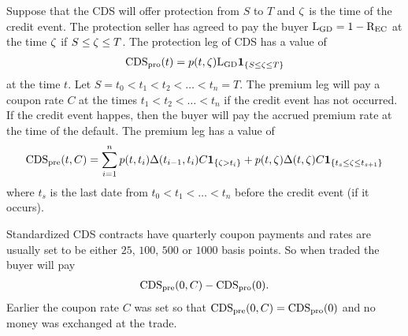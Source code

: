 Suppose that the CDS will offer protection from $S$ to $T$ and $\zeta$ is the time of the credit event. The protection seller has agreed to pay the buyer $\mathrm{L_{GD}} = 1 - \mathrm{R_{EC}}$ at the time $\zeta$ if $S \leq \zeta \leq T$. The protection leg of CDS has a value of
	\begin{align}
		\operatorname{\mathrm{CDS_{pro}}}(t) = p(t, \zeta) \mathrm{L_{GD}} \boldsymbol{1}_{ \{ S \leq \zeta \leq T \} }
	\end{align}
at the time $t$. Let $S = t_0 < t_1 < t_2 < \ldots <t_n = T$. The premium leg will pay a coupon rate $C$ at the times $t_1 < t_2 < \ldots < t_n$ if the credit event has not occurred. If the credit event happes, then the buyer will pay the accrued premium rate at the time of the default. The premium leg has a value of
	\begin{align}
		\operatorname{\mathrm{CDS_{pre}}}(t, C) =\sum_{i=1}^n p(t, t_i) \Delta(t_{i-1},t_i) C \boldsymbol{1}_{ \{ \zeta > t_i \} } + p(t, \zeta) \Delta(t,\zeta) C \boldsymbol{1}_{ \{ t_s \leq \zeta \leq t_{s+1} \} }
	\end{align}
where $t_s$ is the last date from $t_0 < t_1 < \ldots < t_n$ before the credit event (if it occurs).

Standardized CDS contracts have quarterly coupon payments and rates are usually set to be either $25$, $100$, $500$ or $1000$ basis points. So when traded the buyer will pay 
	\begin{align}
		\operatorname{\mathrm{CDS_{pre}}}(0, C) - \operatorname{\mathrm{CDS_{pro}}}(0) .
	\end{align}
Earlier the coupon rate $C$ was set so that $\operatorname{\mathrm{CDS_{pre}}}(0, C) = \operatorname{\mathrm{CDS_{pro}}}(0)$ and no money was exchanged at the trade.




